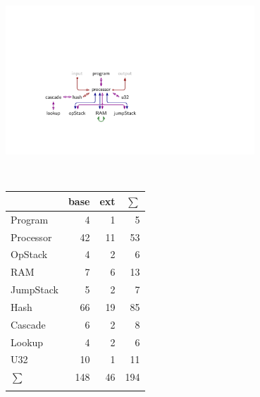 \documentclass{article}
\begin{document}
\newpage
\ \\[2cm]
\begin{center}
\includegraphics[keepaspectratio,width=0.7\textwidth]{src/img/aet-relations.pdf}
\end{center}
\ \\[2cm]
\begin{minipage}{0.5\textwidth}
    \begin{tabular}{lrrr}
        \toprule
                  & base & ext & $\sum$ \\ \midrule
        Program   &    4 &   1 &      5 \\
        Processor &   42 &  11 &     53 \\
        OpStack   &    4 &   2 &      6 \\
        RAM       &    7 &   6 &     13 \\
        JumpStack &    5 &   2 &      7 \\
        Hash      &   66 &  19 &     85 \\
        Cascade   &    6 &   2 &      8 \\
        Lookup    &    4 &   2 &      6 \\
        U32       &   10 &   1 &     11 \\ \bottomrule
        $\sum$    &  148 &  46 &    194 \\
                  &      &     &
    \end{tabular}
\end{minipage}%
\end{document}
